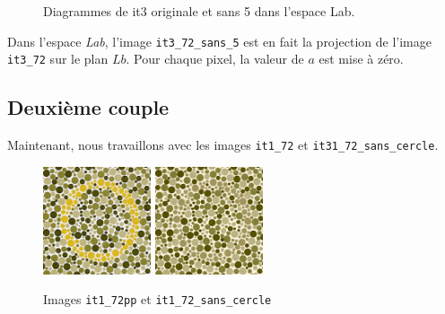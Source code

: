 \documentclass[a4paper,11pt]{article}
\begin{document}
\begin{figure}[H]
  \begin{center}  
    \caption{Diagrammes de it3 originale et sans 5 dans l’espace Lab.}
  \end{center}
\end{figure}

Dans l'espace \textit{Lab}, l'image \texttt{it3\_72\_sans\_5} est en 
fait la projection de l'image \texttt{it3\_72} sur le plan $Lb$. Pour 
chaque pixel, la valeur de $a$ est mise à zéro.\\

\subsection{Deuxième couple}

Maintenant, nous travaillons avec les images \texttt{it1\_72} et 
\texttt{it31\_72\_sans\_cercle}.

\begin{figure}[H]
  \begin{center}  
    \includegraphics[width=120px]{images/it1_72pp.png}
    \includegraphics[width=120px]{images/it1_72pp_sans_cercle.png}
    \caption{Images \texttt{it1\_72pp} et \texttt{it1\_72\_sans\_cercle}}
  \end{center}
\end{figure}
\end{document}
